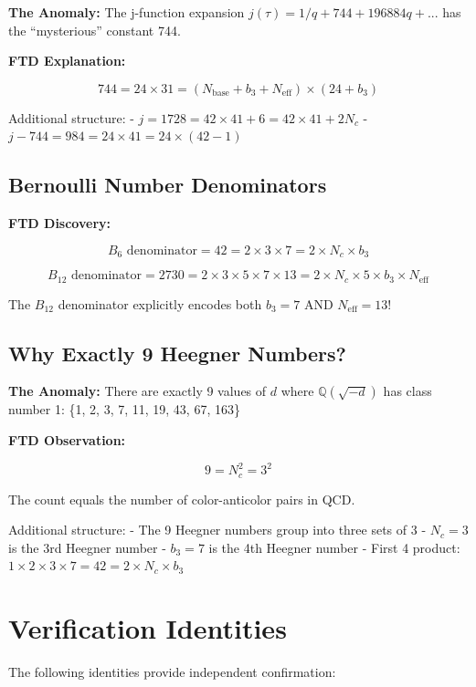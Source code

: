 \documentclass[
  11pt,
  letterpaper,
  twoside,
  openany]{book}
\makeatletter
\let\orig@section\section
\renewcommand{\section}{\needspace{8\baselineskip}\orig@section}
\let\orig@subsection\subsection
\renewcommand{\subsection}{\needspace{6\baselineskip}\orig@subsection}
\makeatother
\begin{document}
\textbf{The Anomaly:} The j-function expansion
\(j(\tau) = 1/q + 744 + 196884q + ...\) has the ``mysterious'' constant
744.

\textbf{FTD Explanation:}

\[744 = 24 \times 31 = (N_{\text{base}} + b_3 + N_{\text{eff}}) \times (24 + b_3)\]

Additional structure: -
\(j = 1728 = 42 \times 41 + 6 = 42 \times 41 + 2N_c\) -
\(j - 744 = 984 = 24 \times 41 = 24 \times (42 - 1)\)

\subsection{Bernoulli Number
Denominators}\label{bernoulli-number-denominators}

\textbf{FTD Discovery:}

\[B_6 \text{ denominator} = 42 = 2 \times 3 \times 7 = 2 \times N_c \times b_3\]

\[B_{12} \text{ denominator} = 2730 = 2 \times 3 \times 5 \times 7 \times 13 = 2 \times N_c \times 5 \times b_3 \times N_{\text{eff}}\]

The \(B_{12}\) denominator explicitly encodes both \(b_3 = 7\) AND
\(N_{\text{eff}} = 13\)!

\subsection{Why Exactly 9 Heegner
Numbers?}\label{why-exactly-9-heegner-numbers}

\textbf{The Anomaly:} There are exactly 9 values of \(d\) where
\(\mathbb{Q}(\sqrt{-d})\) has class number 1: \{1, 2, 3, 7, 11, 19, 43,
67, 163\}

\textbf{FTD Observation:}

\[9 = N_c^2 = 3^2\]

The count equals the number of color-anticolor pairs in QCD.

Additional structure: - The 9 Heegner numbers group into three sets of 3
- \(N_c = 3\) is the 3rd Heegner number - \(b_3 = 7\) is the 4th Heegner
number - First 4 product:
\(1 \times 2 \times 3 \times 7 = 42 = 2 \times N_c \times b_3\)

\section{Verification Identities}\label{verification-identities}

The following identities provide independent confirmation:
\end{document}
